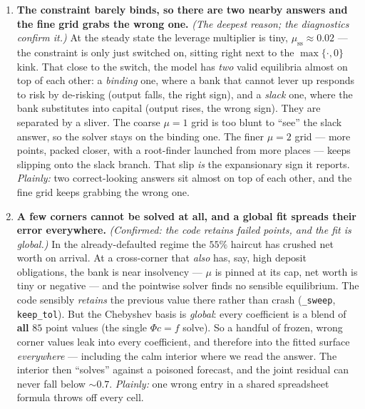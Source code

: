 \documentclass[11pt]{article}
\newcommand{\code}[1]{\texttt{#1}}
\begin{document}
\begin{enumerate}
\item \textbf{The constraint barely binds, so there are two nearby answers
      and the fine grid grabs the wrong one.} \emph{(The deepest reason; the
      diagnostics confirm it.)} At the steady state the leverage multiplier
      is tiny, $\mu_{\text{ss}}\approx0.02$ --- the constraint is only just
      switched on, sitting right next to the $\max\{\cdot,0\}$ kink. That
      close to the switch, the model has \emph{two} valid equilibria almost
      on top of each other: a \emph{binding} one, where a bank that cannot
      lever up responds to risk by de-risking (output falls, the right sign),
      and a \emph{slack} one, where the bank substitutes into capital
      (output rises, the wrong sign). They are separated by a sliver. The
      coarse $\mu=1$ grid is too blunt to ``see'' the slack answer, so the
      solver stays on the binding one. The finer $\mu=2$ grid --- more points,
      packed closer, with a root-finder launched from more places --- keeps
      slipping onto the slack branch. That slip \emph{is} the expansionary
      sign it reports. \emph{Plainly:} two correct-looking answers sit almost
      on top of each other, and the fine grid keeps grabbing the wrong one.

\item \textbf{A few corners cannot be solved at all, and a global fit spreads
      their error everywhere.} \emph{(Confirmed: the code retains failed
      points, and the fit is global.)} In the already-defaulted regime the
      $55\%$ haircut has crushed net worth on arrival. At a cross-corner that
      \emph{also} has, say, high deposit obligations, the bank is near
      insolvency --- $\mu$ is pinned at its cap, net worth is tiny or
      negative --- and the pointwise solver finds no sensible equilibrium.
      The code sensibly \emph{retains} the previous value there rather than
      crash (\code{\_sweep}, \code{keep\_tol}). But the Chebyshev basis is
      \emph{global}: every coefficient is a blend of \textbf{all} $85$ point
      values (the single $\Phi c=f$ solve). So a handful of frozen, wrong
      corner values leak into every coefficient, and therefore into the
      fitted surface \emph{everywhere} --- including the calm interior where we
      read the answer. The interior then ``solves'' against a poisoned
      forecast, and the joint residual can never fall below $\sim0.7$.
      \emph{Plainly:} one wrong entry in a shared spreadsheet formula throws
      off every cell.


\end{enumerate}
\end{document}
